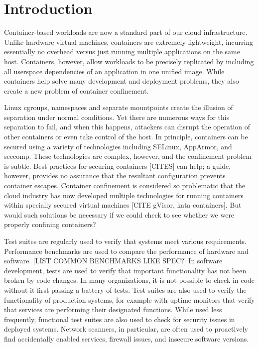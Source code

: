 \section{Introduction}

Container-based workloads are now a standard part of our cloud infrastructure.  Unlike hardware virtual machines, containers are extremely lightweight, incurring essentially no overhead versus just running multiple applications on the same host.  Containers, however, allow workloads to be precisely replicated by including all userspace dependencies of an application in one unified image.  While containers help solve many development and deployment problems, they also create a new problem of container confinement.

Linux cgroups, namespaces and separate mountpoints create the illusion of separation under normal conditions.  Yet there are numerous ways for this separation to fail, and when this happens, attackers can disrupt the operation of other containers or even take control of the host.  In principle, containers can be secured using a variety of technologies including SELinux, AppArmor, and seccomp.  These technologies are complex, however, and the confinement problem is subtle.  Best practices for securing containers [CITES] can help; a guide, however, provides no assurance that the resultant configuration prevents container escapes.  Container confinement is considered so problematic that the cloud industry has now developed multiple technologies for running containers within specially secured virtual machines [CITE gVisor, kata containers].  But would such solutions be necessary if we could check to see whether we were properly confining containers?

Test suites are regularly used to verify that systems meet various requirements.  Performance benchmarks are used to compare the performance of hardware and software.  [LIST COMMON BENCHMARKS LIKE SPEC?]  In software development, tests are used to verify that important functionality has not been broken by code changes.  In many organizations, it is not possible to check in code without it first passing a battery of tests.  Test suites are also used to verify the functionality of production systems, for example with uptime monitors that verify that services are performing their designated functions.  While used less frequently, functional test suites are also used to check for security issues in deployed systems.  Network scanners, in particular, are often used to proactively find accidentally enabled services, firewall issues, and insecure software versions.

